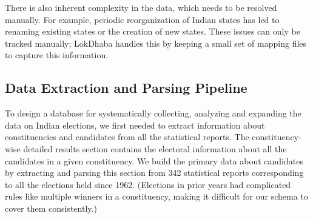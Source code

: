 There is also inherent complexity in the data, which needs to be resolved manually. For example, periodic reorganization of Indian states has led to renaming existing states or the creation of new states. These issues can only be tracked manually; LokDhaba handles this by keeping a small set of mapping files to capture this information.

 
\subsection{Data Extraction and Parsing Pipeline}

To design a database for systematically collecting, analyzing and expanding the data on Indian elections, we first needed to extract information about constituencies and candidates from all the statistical reports. The constituency-wise detailed results section contains the electoral information about all the candidates in a given constituency. We build the primary data about candidates by extracting and parsing this section from 342 statistical reports corresponding to all the elections held since 1962. (Elections in prior years had complicated rules like multiple winners in a constituency, making it difficult for our schema to cover them consistently.) 

